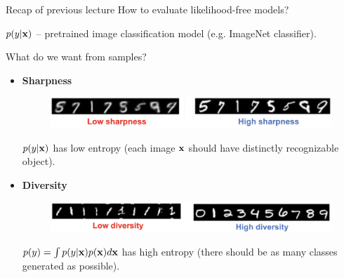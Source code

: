 

\usepackage{tikz}

\usetikzlibrary{arrows,shapes,positioning,shadows,trees}

\begin{frame}
\titlepage
\end{frame}
\begin{frame}{Recap of previous lecture}
	How to evaluate likelihood-free models?
	
	$p(y | \mathbf{x})$ -- pretrained image classification model (e.g. ImageNet classifier).
	\begin{block}{What do we want from samples?}
		\begin{itemize}
			\item \textbf{Sharpness}
			\begin{figure}
				\centering
				\includegraphics[width=0.9\linewidth]{figs/sharpness}
			\end{figure}
			$p(y | \mathbf{x})$ has low entropy (each image $\mathbf{x}$ should have distinctly recognizable object).
			\item \textbf{Diversity}
			\begin{figure}
				\centering
				\includegraphics[width=0.9\linewidth]{figs/diversity}
			\end{figure}
			$p(y) = \int p(y | \mathbf{x}) p(\mathbf{x}) d \mathbf{x}$ has high entropy (there should be as many classes generated as possible).
		\end{itemize}
	\end{block}
\end{frame}
